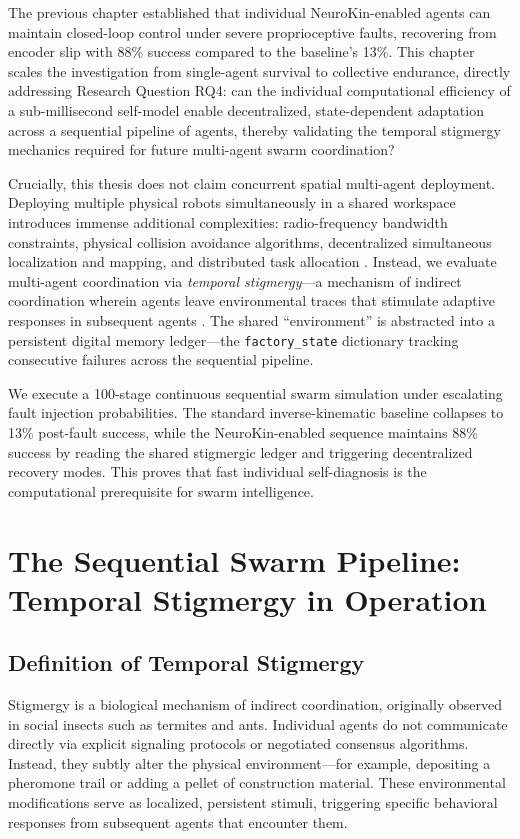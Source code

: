 \documentclass[12pt,a4paper,oneside]{report}
\begin{document}
The previous chapter established that individual NeuroKin-enabled agents can maintain closed-loop control under severe proprioceptive faults, recovering from encoder slip with 88\% success compared to the baseline's 13\%. This chapter scales the investigation from single-agent survival to collective endurance, directly addressing Research Question RQ4: can the individual computational efficiency of a sub-millisecond self-model enable decentralized, state-dependent adaptation across a sequential pipeline of agents, thereby validating the temporal stigmergy mechanics required for future multi-agent swarm coordination?

Crucially, this thesis does not claim concurrent spatial multi-agent deployment. Deploying multiple physical robots simultaneously in a shared workspace introduces immense additional complexities: radio-frequency bandwidth constraints, physical collision avoidance algorithms, decentralized simultaneous localization and mapping, and distributed task allocation \cite{matsuki2024gaussian, keetha2024splattam}. Instead, we evaluate multi-agent coordination via \textit{temporal stigmergy}---a mechanism of indirect coordination wherein agents leave environmental traces that stimulate adaptive responses in subsequent agents \cite{bongard2006resilient}. The shared ``environment'' is abstracted into a persistent digital memory ledger---the \texttt{factory\_state} dictionary tracking consecutive failures across the sequential pipeline.

We execute a 100-stage continuous sequential swarm simulation under escalating fault injection probabilities. The standard inverse-kinematic baseline collapses to 13\% post-fault success, while the NeuroKin-enabled sequence maintains 88\% success by reading the shared stigmergic ledger and triggering decentralized recovery modes. This proves that fast individual self-diagnosis is the computational prerequisite for swarm intelligence.

\section{The Sequential Swarm Pipeline: Temporal Stigmergy in Operation}

\subsection{Definition of Temporal Stigmergy}

Stigmergy is a biological mechanism of indirect coordination, originally observed in social insects such as termites and ants. Individual agents do not communicate directly via explicit signaling protocols or negotiated consensus algorithms. Instead, they subtly alter the physical environment---for example, depositing a pheromone trail or adding a pellet of construction material. These environmental modifications serve as localized, persistent stimuli, triggering specific behavioral responses from subsequent agents that encounter them.
\end{document}
